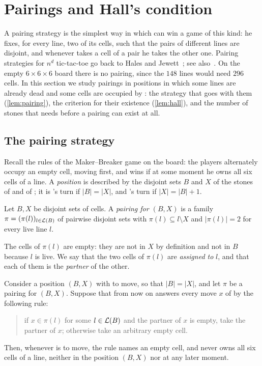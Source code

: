 \section{Pairings and Hall's condition}\label{sec:pairing}

A pairing strategy is the simplest way in which \Breaker{} can win a game of this kind: he fixes, for
every line, two of its cells, such that the pairs of different lines are disjoint, and whenever \Maker{}
takes a cell of a pair he takes the other one. Pairing strategies for $n^d$ tic-tac-toe go back to
Hales and Jewett~\cite{HalesJewett1963}; see also~\cite{Beck2008,Krivelevich2014}. On the empty $6\times6\times6$ board
there is no pairing, since the $148$ lines would need $296$ cells. In this section we study pairings in
positions in which some lines are already dead and some cells are occupied by \Maker: the strategy that
goes with them (\cref{lem:pairing}), the criterion for their existence (\cref{lem:hall}), and the number
of stones that \Breaker{} needs before a pairing can exist at all.

\subsection{The pairing strategy}\label{ssec:pairing-strategy}

Recall the rules of the Maker--Breaker game on the board: the players alternately occupy an empty cell,
\Maker{} moving first, and \Maker{} wins if at some moment he owns all six cells of a line. A
\emph{position} is described by the disjoint sets $B$ and $X$ of the stones of \Breaker{} and of \Maker;
it is \Maker's turn if $|B|=|X|$, and \Breaker's turn if $|X|=|B|+1$.

\begin{definition}[Pairing]\label{def:pairing}
Let $B,X$ be disjoint sets of cells. A \emph{pairing for $(B,X)$} is a family $\pi=(\pi(l))_{l\in\mathcal{L}(B)}$
of pairwise disjoint sets with $\pi(l)\subseteq l\setminus X$ and $|\pi(l)|=2$ for every live line $l$.
\end{definition}

The cells of $\pi(l)$ are empty: they are not in $X$ by definition and not in $B$ because $l$ is live.
We say that the two cells of $\pi(l)$ are \emph{assigned to} $l$, and that each of them is the
\emph{partner} of the other.

\begin{lemma}\label{lem:pairing}
Consider a position $(B,X)$ with \Maker{} to move, so that $|B|=|X|$, and let $\pi$ be a pairing for
$(B,X)$. Suppose that from now on \Breaker{} answers every move $x$ of \Maker{} by the following rule:
\begin{quote}
if $x\in\pi(l)$ for some $l\in\mathcal{L}(B)$ and the partner of $x$ is empty, take the partner of $x$;
otherwise take an arbitrary empty cell.
\end{quote}
Then, whenever \Breaker{} is to move, the rule names an empty cell, and \Maker{} never owns all six cells
of a line, neither in the position $(B,X)$ nor at any later moment.
\end{lemma}


